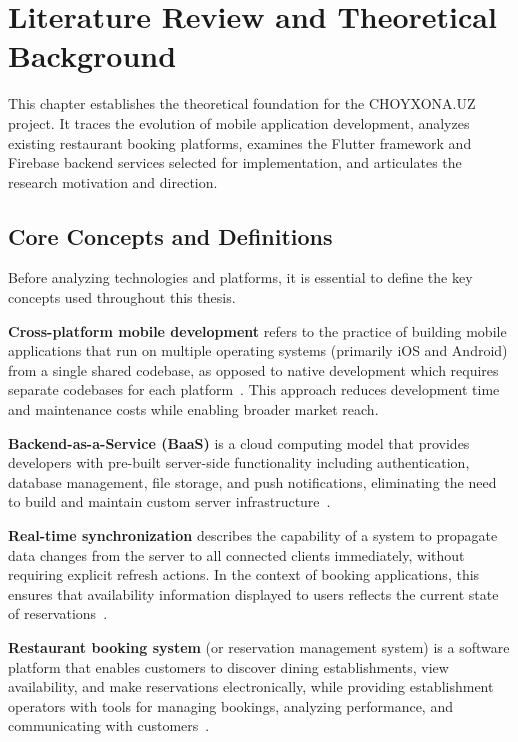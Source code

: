 \chapter{Literature Review and Theoretical Background}
\label{ch:literature}

This chapter establishes the theoretical foundation for the CHOYXONA.UZ project.
It traces the evolution of mobile application development, analyzes existing restaurant booking platforms, examines the Flutter framework and Firebase backend services selected for implementation, and articulates the research motivation and direction.


\section{Core Concepts and Definitions}
\label{sec:core-concepts}

Before analyzing technologies and platforms, it is essential to define the key concepts used throughout this thesis.

\textbf{Cross-platform mobile development} refers to the practice of building mobile applications that run on multiple operating systems (primarily iOS and Android) from a single shared codebase, as opposed to native development which requires separate codebases for each platform~\cite{elkassas2017}.
This approach reduces development time and maintenance costs while enabling broader market reach.

\textbf{Backend-as-a-Service (BaaS)} is a cloud computing model that provides developers with pre-built server-side functionality including authentication, database management, file storage, and push notifications, eliminating the need to build and maintain custom server infrastructure~\cite{moroney2017}.

\textbf{Real-time synchronization} describes the capability of a system to propagate data changes from the server to all connected clients immediately, without requiring explicit refresh actions.
In the context of booking applications, this ensures that availability information displayed to users reflects the current state of reservations~\cite{firebase_firestore2024}.

\textbf{Restaurant booking system} (or reservation management system) is a software platform that enables customers to discover dining establishments, view availability, and make reservations electronically, while providing establishment operators with tools for managing bookings, analyzing performance, and communicating with customers~\cite{opentable2023}.

